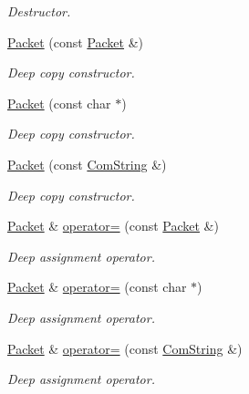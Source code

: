 \begin{DoxyCompactItemize}
\begin{DoxyCompactList}\small\item\em Destructor. \item\end{DoxyCompactList}\item 
\hyperlink{class_packet_ad134c30752b0a1991a33b924b85209c2}{Packet} (const \hyperlink{class_packet}{Packet} \&)
\begin{DoxyCompactList}\small\item\em Deep copy constructor. \item\end{DoxyCompactList}\item 
\hyperlink{class_packet_a2df61111e81a889f28e924b0ee84385c}{Packet} (const char $\ast$)
\begin{DoxyCompactList}\small\item\em Deep copy constructor. \item\end{DoxyCompactList}\item 
\hyperlink{class_packet_a88366956fa402c10fed30b1f15a36c22}{Packet} (const \hyperlink{class_com_string}{ComString} \&)
\begin{DoxyCompactList}\small\item\em Deep copy constructor. \item\end{DoxyCompactList}\item 
\hyperlink{class_packet}{Packet} \& \hyperlink{class_packet_a7f957f789fa6ad8875d1afe4e5f4b1dc}{operator=} (const \hyperlink{class_packet}{Packet} \&)
\begin{DoxyCompactList}\small\item\em Deep assignment operator. \item\end{DoxyCompactList}\item 
\hyperlink{class_packet}{Packet} \& \hyperlink{class_packet_ac980b3b22cf9f2110c637c67c20de499}{operator=} (const char $\ast$)
\begin{DoxyCompactList}\small\item\em Deep assignment operator. \item\end{DoxyCompactList}\item 
\hyperlink{class_packet}{Packet} \& \hyperlink{class_packet_a42bf2d88a9a7449727ffb705fb9f0612}{operator=} (const \hyperlink{class_com_string}{ComString} \&)
\begin{DoxyCompactList}\small\item\em Deep assignment operator. \item\end{DoxyCompactList}\item 

\end{DoxyCompactItemize}
